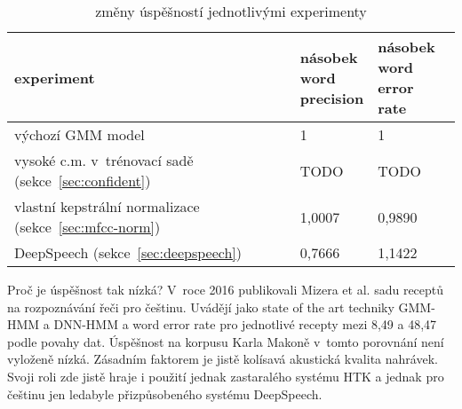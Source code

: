 \begin{table}[htpb]
\begin{center}
\begin{tabular}{|l|l|l|}
\hline
experiment & \makecell{násobek\\ word\\ precision} & \makecell{násobek\\ word error\\ rate} \\
\hline
výchozí GMM model  & 1 & 1 \\
vysoké c.m. v~trénovací sadě (sekce~\ref{sec:confident}) & TODO & TODO \\
vlastní kepstrální normalizace (sekce~\ref{sec:mfcc-norm}) & 1,0007 & 0,9890 \\
DeepSpeech (sekce~\ref{sec:deepspeech}) & 0,7666 & 1,1422 \\
\hline
\end{tabular}
\caption{změny úspěšností jednotlivými experimenty}\label{tab:asr-scores}
\end{center}
\end{table}

Proč je úspěšnost tak nízká? V~roce 2016 publikovali Mizera et
al.\cite{mizera2016kaldi} sadu receptů na rozpoznávání řeči pro češtinu.
Uvádějí jako state of the art techniky GMM-HMM a DNN-HMM a word error rate pro
jednotlivé recepty mezi 8,49 a 48,47 podle povahy dat. Úspěšnost na korpusu
Karla Makoně v~tomto porovnání není vyloženě nízká. Zásadním faktorem je jistě
kolísavá akustická kvalita nahrávek. Svoji roli zde jistě hraje i použití jednak
zastaralého systému HTK a jednak pro češtinu jen ledabyle přizpůsobeného
systému DeepSpeech.
